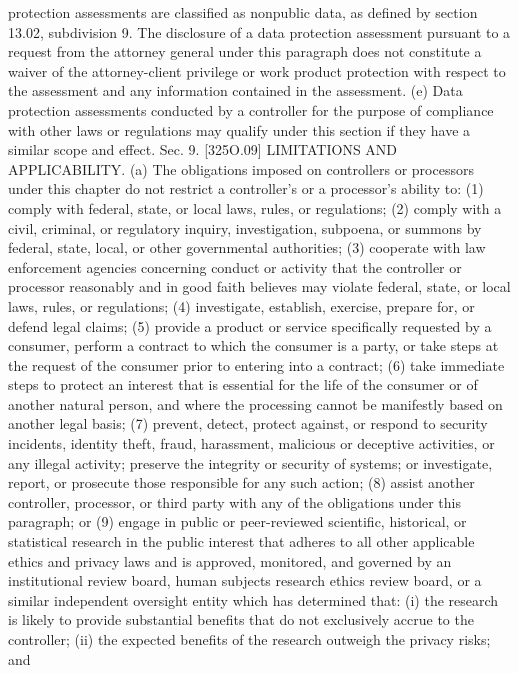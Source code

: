 protection assessments are classified as nonpublic data, as defined by section 13.02,
subdivision 9. The disclosure of a data protection assessment pursuant to a request from the
attorney general under this paragraph does not constitute a waiver of the attorney-client
privilege or work product protection with respect to the assessment and any information
contained in the assessment.
(e) Data protection assessments conducted by a controller for the purpose of compliance
with other laws or regulations may qualify under this section if they have a similar scope
and effect.
Sec. 9. [325O.09] LIMITATIONS AND APPLICABILITY.
(a) The obligations imposed on controllers or processors under this chapter do not restrict
a controller's or a processor's ability to:
(1) comply with federal, state, or local laws, rules, or regulations;
(2) comply with a civil, criminal, or regulatory inquiry, investigation, subpoena, or
summons by federal, state, local, or other governmental authorities;
(3) cooperate with law enforcement agencies concerning conduct or activity that the
controller or processor reasonably and in good faith believes may violate federal, state, or
local laws, rules, or regulations;
(4) investigate, establish, exercise, prepare for, or defend legal claims;
(5) provide a product or service specifically requested by a consumer, perform a contract
to which the consumer is a party, or take steps at the request of the consumer prior to entering
into a contract;
(6) take immediate steps to protect an interest that is essential for the life of the consumer
or of another natural person, and where the processing cannot be manifestly based on another
legal basis;
(7) prevent, detect, protect against, or respond to security incidents, identity theft, fraud,
harassment, malicious or deceptive activities, or any illegal activity; preserve the integrity
or security of systems; or investigate, report, or prosecute those responsible for any such
action;
(8) assist another controller, processor, or third party with any of the obligations under
this paragraph; or
(9) engage in public or peer-reviewed scientific, historical, or statistical research in the
public interest that adheres to all other applicable ethics and privacy laws and is approved,
monitored, and governed by an institutional review board, human subjects research ethics
review board, or a similar independent oversight entity which has determined that:
(i) the research is likely to provide substantial benefits that do not exclusively accrue to
the controller;
(ii) the expected benefits of the research outweigh the privacy risks; and
